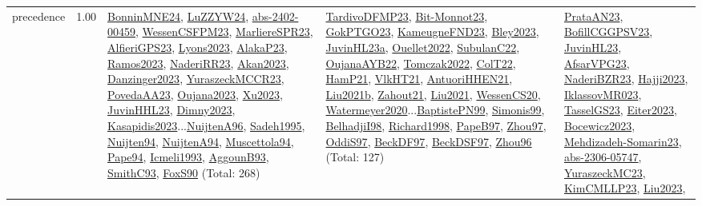 {\begin{longtable}{p{3cm}r>{\raggedright\arraybackslash}p{6cm}>{\raggedright\arraybackslash}p{6cm}>{\raggedright\arraybackslash}p{8cm}}
\index{precedence}\index{Concepts!precedence}precedence &  1.00 & \hyperref[detail:BonninMNE24]{BonninMNE24}, \hyperref[detail:LuZZYW24]{LuZZYW24}, \hyperref[detail:abs-2402-00459]{abs-2402-00459}, \hyperref[detail:WessenCSFPM23]{WessenCSFPM23}, \hyperref[detail:MarliereSPR23]{MarliereSPR23}, \hyperref[detail:AlfieriGPS23]{AlfieriGPS23}, \hyperref[detail:Lyons2023]{Lyons2023}, \hyperref[detail:AlakaP23]{AlakaP23}, \hyperref[detail:Ramos2023]{Ramos2023}, \hyperref[detail:NaderiRR23]{NaderiRR23}, \hyperref[detail:Akan2023]{Akan2023}, \hyperref[detail:Danzinger2023]{Danzinger2023}, \hyperref[detail:YuraszeckMCCR23]{YuraszeckMCCR23}, \hyperref[detail:PovedaAA23]{PovedaAA23}, \hyperref[detail:Oujana2023]{Oujana2023}, \hyperref[detail:Xu2023]{Xu2023}, \hyperref[detail:JuvinHHL23]{JuvinHHL23}, \hyperref[detail:Dimny2023]{Dimny2023}, \hyperref[detail:Kasapidis2023]{Kasapidis2023}...\hyperref[detail:NuijtenA96]{NuijtenA96}, \hyperref[detail:Sadeh1995]{Sadeh1995}, \hyperref[detail:Nuijten94]{Nuijten94}, \hyperref[detail:NuijtenA94]{NuijtenA94}, \hyperref[detail:Muscettola94]{Muscettola94}, \hyperref[detail:Pape94]{Pape94}, \hyperref[detail:Icmeli1993]{Icmeli1993}, \hyperref[detail:AggounB93]{AggounB93}, \hyperref[detail:SmithC93]{SmithC93}, \hyperref[detail:FoxS90]{FoxS90} (Total: 268) & \hyperref[detail:TardivoDFMP23]{TardivoDFMP23}, \hyperref[detail:Bit-Monnot23]{Bit-Monnot23}, \hyperref[detail:GokPTGO23]{GokPTGO23}, \hyperref[detail:KameugneFND23]{KameugneFND23}, \hyperref[detail:Bley2023]{Bley2023}, \hyperref[detail:JuvinHL23a]{JuvinHL23a}, \hyperref[detail:Ouellet2022]{Ouellet2022}, \hyperref[detail:SubulanC22]{SubulanC22}, \hyperref[detail:OujanaAYB22]{OujanaAYB22}, \hyperref[detail:Tomczak2022]{Tomczak2022}, \hyperref[detail:ColT22]{ColT22}, \hyperref[detail:HamP21]{HamP21}, \hyperref[detail:VlkHT21]{VlkHT21}, \hyperref[detail:AntuoriHHEN21]{AntuoriHHEN21}, \hyperref[detail:Liu2021b]{Liu2021b}, \hyperref[detail:Zahout21]{Zahout21}, \hyperref[detail:Liu2021]{Liu2021}, \hyperref[detail:WessenCS20]{WessenCS20}, \hyperref[detail:Watermeyer2020]{Watermeyer2020}...\hyperref[detail:BaptistePN99]{BaptistePN99}, \hyperref[detail:Simonis99]{Simonis99}, \hyperref[detail:BelhadjiI98]{BelhadjiI98}, \hyperref[detail:Richard1998]{Richard1998}, \hyperref[detail:PapeB97]{PapeB97}, \hyperref[detail:Zhou97]{Zhou97}, \hyperref[detail:OddiS97]{OddiS97}, \hyperref[detail:BeckDF97]{BeckDF97}, \hyperref[detail:BeckDSF97]{BeckDSF97}, \hyperref[detail:Zhou96]{Zhou96} (Total: 127) & \hyperref[detail:PrataAN23]{PrataAN23}, \hyperref[detail:BofillCGGPSV23]{BofillCGGPSV23}, \hyperref[detail:JuvinHL23]{JuvinHL23}, \hyperref[detail:AfsarVPG23]{AfsarVPG23}, \hyperref[detail:NaderiBZR23]{NaderiBZR23}, \hyperref[detail:Hajji2023]{Hajji2023}, \hyperref[detail:IklassovMR023]{IklassovMR023}, \hyperref[detail:TasselGS23]{TasselGS23}, \hyperref[detail:Eiter2023]{Eiter2023}, \hyperref[detail:Bocewicz2023]{Bocewicz2023}, \hyperref[detail:Mehdizadeh-Somarin23]{Mehdizadeh-Somarin23}, \hyperref[detail:abs-2306-05747]{abs-2306-05747}, \hyperref[detail:YuraszeckMC23]{YuraszeckMC23}, \hyperref[detail:KimCMLLP23]{KimCMLLP23}, \hyperref[detail:Liu2023]{Liu2023}, 
\end{longtable}}
